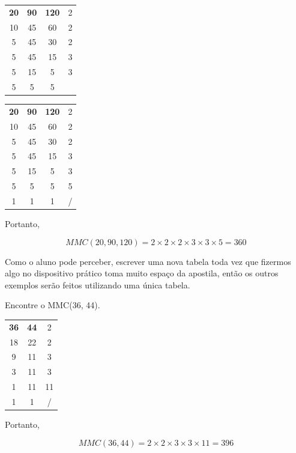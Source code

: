 \begin{exemplo}
    \begin{table}[H]
    \centering
    \begin{tabular}{ccc|c}
        \textbf{20} & \textbf{90} & \textbf{120} & 2\\
        10 & 45 & 60 & 2\\
        5 & 45 & 30 & 2\\
        5 & 45 & 15 & 3\\
        5 & 15 & 5 & 3\\
        5 & 5 & 5 & \\
    \end{tabular}
    \end{table}

    \begin{table}[H]
    \centering
    \begin{tabular}{ccc|c}
        \textbf{20} & \textbf{90} & \textbf{120} & 2\\
        10 & 45 & 60 & 2\\
        5 & 45 & 30 & 2\\
        5 & 45 & 15 & 3\\
        5 & 15 & 5 & 3\\
        5 & 5 & 5 & 5\\
        1 & 1 & 1 & /\\
    \end{tabular}
    \end{table}

    Portanto,

    \begin{equation}
        MMC(20,90,120)=2\times2\times2\times3\times3\times5=360
    \end{equation}
\end{exemplo}

Como o aluno pode perceber, escrever uma nova tabela toda vez que fizermos algo no dispositivo prático toma muito espaço da apostila, então os outros exemplos serão feitos utilizando uma única tabela.

\begin{exemplo}
    Encontre o MMC(36, 44).

    \begin{table}[H]
    \centering
    \begin{tabular}{cc|c}
        \textbf{36} & \textbf{44} & 2\\
        18 & 22 & 2\\
        9 & 11 & 3\\
        3 & 11 & 3\\
        1 & 11 & 11\\
        1 & 1 & /\\
    \end{tabular}
    \end{table}

    Portanto,

    \begin{equation}
        MMC(36,44)=2\times2\times3\times3\times11=396
    \end{equation}
\end{exemplo}

